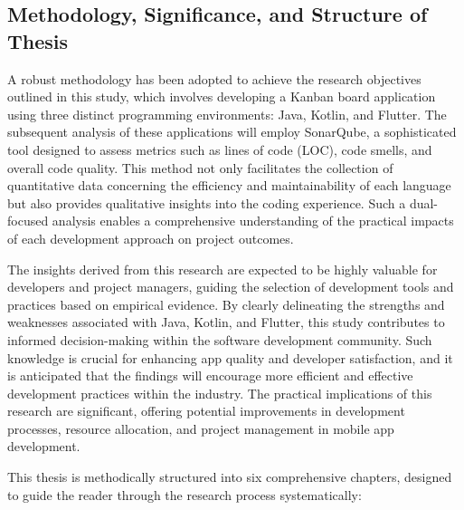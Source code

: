 \subsection{Methodology, Significance, and Structure of Thesis}
A robust methodology has been adopted to achieve the research objectives outlined in this study, which involves developing a Kanban board application using three distinct programming environments: Java, Kotlin, and Flutter. The subsequent analysis of these applications will employ SonarQube, a sophisticated tool designed to assess metrics such as lines of code (LOC), code smells, and overall code quality. This method not only facilitates the collection of quantitative data concerning the efficiency and maintainability of each language but also provides qualitative insights into the coding experience. Such a dual-focused analysis enables a comprehensive understanding of the practical impacts of each development approach on project outcomes.
\par
The insights derived from this research are expected to be highly valuable for developers and project managers, guiding the selection of development tools and practices based on empirical evidence. By clearly delineating the strengths and weaknesses associated with Java, Kotlin, and Flutter, this study contributes to informed decision-making within the software development community. Such knowledge is crucial for enhancing app quality and developer satisfaction, and it is anticipated that the findings will encourage more efficient and effective development practices within the industry. The practical implications of this research are significant, offering potential improvements in development processes, resource allocation, and project management in mobile app development.
\par
This thesis is methodically structured into six comprehensive chapters, designed to guide the reader through the research process systematically:

